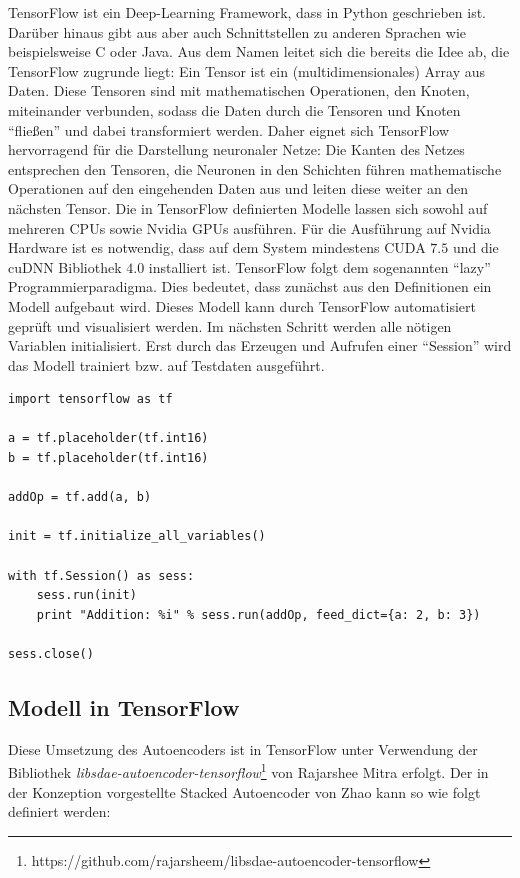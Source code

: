 TensorFlow ist ein Deep-Learning Framework, dass in Python geschrieben ist. Darüber hinaus gibt aus aber auch Schnittstellen zu anderen Sprachen wie beispielsweise C oder Java. Aus dem Namen leitet sich die bereits die Idee ab, die TensorFlow zugrunde liegt: Ein Tensor ist ein (multidimensionales) Array aus Daten. Diese Tensoren sind mit mathematischen Operationen, den Knoten, miteinander verbunden, sodass die Daten durch die Tensoren und Knoten \enquote{fließen} und dabei transformiert werden. Daher eignet sich TensorFlow hervorragend für die Darstellung neuronaler Netze: Die Kanten des Netzes entsprechen den Tensoren, die Neuronen in den Schichten führen mathematische Operationen auf den eingehenden Daten aus und leiten diese weiter an den nächsten Tensor. Die in TensorFlow definierten Modelle lassen sich sowohl auf mehreren CPUs sowie Nvidia GPUs ausführen. Für die Ausführung auf Nvidia Hardware ist es notwendig, dass auf dem System mindestens CUDA $7.5$ und die cuDNN Bibliothek $4.0$ installiert ist. 
TensorFlow folgt dem sogenannten \enquote{lazy} Programmierparadigma. Dies bedeutet, dass zunächst aus den Definitionen ein Modell aufgebaut wird. Dieses Modell kann durch TensorFlow automatisiert geprüft und visualisiert werden. Im nächsten Schritt werden alle nötigen Variablen initialisiert. Erst durch das Erzeugen und Aufrufen einer \enquote{Session} wird das Modell trainiert bzw. auf Testdaten ausgeführt.

\begin{lstlisting}[style=Python]
import tensorflow as tf

a = tf.placeholder(tf.int16)
b = tf.placeholder(tf.int16)

addOp = tf.add(a, b)

init = tf.initialize_all_variables()

with tf.Session() as sess:
    sess.run(init)
    print "Addition: %i" % sess.run(addOp, feed_dict={a: 2, b: 3})

sess.close()
\end{lstlisting}

\subsection{Modell in TensorFlow}

Diese Umsetzung des Autoencoders ist in TensorFlow unter Verwendung der Bibliothek \textit{libsdae-autoencoder-tensorflow}\footnote{https://github.com/rajarsheem/libsdae-autoencoder-tensorflow} von Rajarshee Mitra erfolgt. Der in der Konzeption vorgestellte Stacked Autoencoder von Zhao kann so wie folgt definiert werden:

